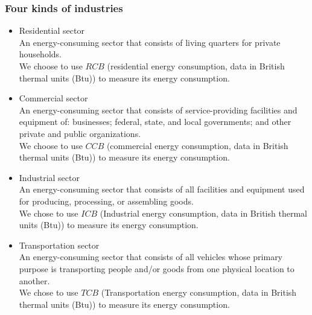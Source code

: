\documentclass{mcmthesis}
\begin{document}
\subsubsection{Four kinds of industries}
\begin{itemize}
  \item Residential sector\\
  An energy-consuming sector that consists of living quarters for private households.\\
  We choose to use $RCB$ (residential energy consumption, data in British thermal units (Btu)) to measure its energy consumption.
  \item Commercial sector\\
  An energy-consuming sector that consists of service-providing facilities and equipment of: businesses; federal,
  state, and local governments; and other private and public organizations. \\
  We choose to use $CCB$ (commercial energy consumption, data in British thermal units (Btu)) to measure its energy consumption.
  \item Industrial sector\\
  An energy-consuming sector that consists of all facilities and equipment used for producing, processing, or assembling goods.\\
  We chose to use $ICB$ (Industrial energy consumption, data in British thermal units (Btu)) to measure its energy consumption.
  \item Transportation sector\\
  An energy-consuming sector that consists of all vehicles whose primary purpose is transporting people and/or
  goods from one physical location to another.\\
  We chose to use $TCB$ (Transportation energy consumption, data in British thermal units (Btu)) to measure its energy consumption.
\end{itemize}
\end{document}
